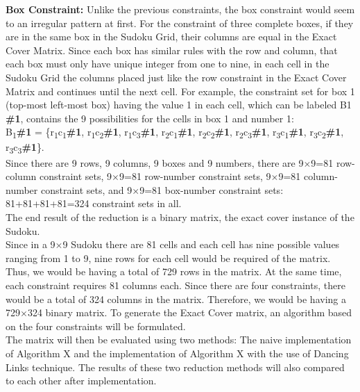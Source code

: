 \documentclass[a4paper,oneside,11pt]{report}
\begin{document}
\textbf{Box Constraint:} Unlike the previous constraints, the box constraint would seem to an irregular pattern at first. For the constraint of three complete boxes, if they are in the same box in the Sudoku Grid, their columns are equal in the Exact Cover Matrix. Since each box has similar rules with the row and column, that each box must only have unique integer from one to nine, in each cell in the Sudoku Grid the columns placed just like the row constraint in the Exact Cover Matrix and continues until the next cell. For example, the constraint set for box 1 (top-most left-most box) having the value 1 in each cell, which can be labeled B1 \textbf{\#1}, contains the 9 possibilities for the cells in box 1 and number 1:\\
B\textsubscript{1}\textbf{\#1} = \{r\textsubscript{1}c\textsubscript{1}\textbf{\#1}, r\textsubscript{1}c\textsubscript{2}\textbf{\#1}, r\textsubscript{1}c\textsubscript{3}\textbf{\#1}, r\textsubscript{2}c\textsubscript{1}\textbf{\#1}, r\textsubscript{2}c\textsubscript{2}\textbf{\#1}, r\textsubscript{2}c\textsubscript{3}\textbf{\#1}, r\textsubscript{3}c\textsubscript{1}\textbf{\#1}, r\textsubscript{3}c\textsubscript{2}\textbf{\#1}, r\textsubscript{3}c\textsubscript{3}\textbf{\#1}\}.\\

Since there are 9 rows, 9 columns, 9 boxes and 9 numbers, there are 9$\times$9=81 row-column constraint sets, 9$\times$9=81 row-number constraint sets, 9$\times$9=81 column-number constraint sets, and 9$\times$9=81 box-number constraint sets: 81+81+81+81=324 constraint sets in all.\\

The end result of the reduction is a binary matrix, the exact cover instance of the Sudoku.\\

Since in a 9$\times$9 Sudoku there are 81 cells and each cell has nine possible values ranging from 1 to 9, nine rows for each cell would be required of the matrix. Thus, we would be having a total of 729 rows in the matrix. At the same time, each constraint requires 81 columns each. Since there are four constraints, there would be a total of 324 columns in the matrix. Therefore, we would be having a 729$\times$324 binary matrix. To generate the Exact Cover matrix, an algorithm based on the four constraints will be formulated.\\

The matrix will then be evaluated using two methods: The naive implementation of Algorithm X and the implementation of Algorithm X with the use of Dancing Links technique. The results of  these two reduction methods will also compared to each other after implementation.
\end{document}
